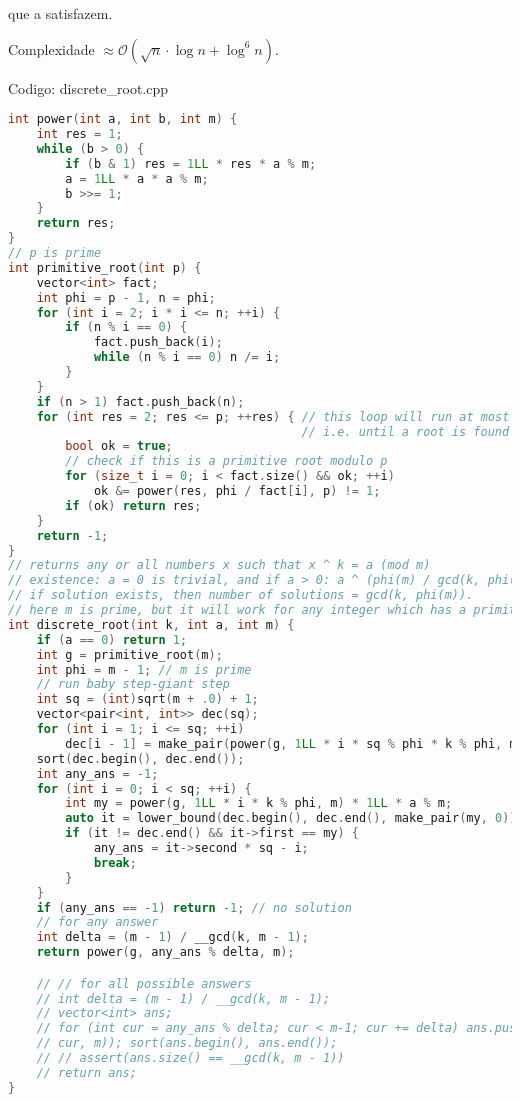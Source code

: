 \documentclass[10pt, a4paper, oneside]{book}
\begin{document}
que a satisfazem. 



Complexidade $\approx \mathcal{O}(\sqrt{n} \cdot \log n + \log^6 n) $. 

\hfill

Codigo: discrete\_root.cpp

\begin{lstlisting}[language=C++]
int power(int a, int b, int m) {
    int res = 1;
    while (b > 0) {
        if (b & 1) res = 1LL * res * a % m;
        a = 1LL * a * a % m;
        b >>= 1;
    }
    return res;
}
// p is prime
int primitive_root(int p) {
    vector<int> fact;
    int phi = p - 1, n = phi;
    for (int i = 2; i * i <= n; ++i) {
        if (n % i == 0) {
            fact.push_back(i);
            while (n % i == 0) n /= i;
        }
    }
    if (n > 1) fact.push_back(n);
    for (int res = 2; res <= p; ++res) { // this loop will run at most (logp ^ 6) times
                                         // i.e. until a root is found
        bool ok = true;
        // check if this is a primitive root modulo p
        for (size_t i = 0; i < fact.size() && ok; ++i)
            ok &= power(res, phi / fact[i], p) != 1;
        if (ok) return res;
    }
    return -1;
}
// returns any or all numbers x such that x ^ k = a (mod m)
// existence: a = 0 is trivial, and if a > 0: a ^ (phi(m) / gcd(k, phi(m))) == 1 mod m
// if solution exists, then number of solutions = gcd(k, phi(m)).
// here m is prime, but it will work for any integer which has a primitive root
int discrete_root(int k, int a, int m) {
    if (a == 0) return 1;
    int g = primitive_root(m);
    int phi = m - 1; // m is prime
    // run baby step-giant step
    int sq = (int)sqrt(m + .0) + 1;
    vector<pair<int, int>> dec(sq);
    for (int i = 1; i <= sq; ++i)
        dec[i - 1] = make_pair(power(g, 1LL * i * sq % phi * k % phi, m), i);
    sort(dec.begin(), dec.end());
    int any_ans = -1;
    for (int i = 0; i < sq; ++i) {
        int my = power(g, 1LL * i * k % phi, m) * 1LL * a % m;
        auto it = lower_bound(dec.begin(), dec.end(), make_pair(my, 0));
        if (it != dec.end() && it->first == my) {
            any_ans = it->second * sq - i;
            break;
        }
    }
    if (any_ans == -1) return -1; // no solution
    // for any answer
    int delta = (m - 1) / __gcd(k, m - 1);
    return power(g, any_ans % delta, m);

    // // for all possible answers
    // int delta = (m - 1) / __gcd(k, m - 1);
    // vector<int> ans;
    // for (int cur = any_ans % delta; cur < m-1; cur += delta) ans.push_back(power(g,
    // cur, m)); sort(ans.begin(), ans.end());
    // // assert(ans.size() == __gcd(k, m - 1))
    // return ans;
}
\end{lstlisting}
\hfill
\end{document}
